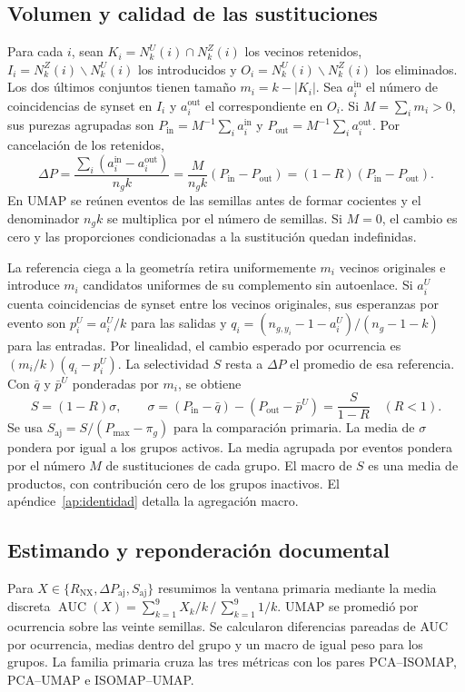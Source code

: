 \subsection{Volumen y calidad de las sustituciones}\label{sec:descomposicion}
Para cada $i$, sean $K_i=N^U_k(i)\cap N^Z_k(i)$ los vecinos retenidos, $I_i=N^Z_k(i)\mathbin{\backslash} N^U_k(i)$ los introducidos y $O_i=N^U_k(i)\mathbin{\backslash} N^Z_k(i)$ los eliminados. Los dos últimos conjuntos tienen tamaño $m_i=k-|K_i|$. Sea $a_i^{\mathrm{in}}$ el número de coincidencias de synset en $I_i$ y $a_i^{\mathrm{out}}$ el correspondiente en $O_i$. Si $M=\sum_i m_i>0$, sus purezas agrupadas son $P_{\mathrm{in}}=M^{-1}\sum_i a_i^{\mathrm{in}}$ y $P_{\mathrm{out}}=M^{-1}\sum_i a_i^{\mathrm{out}}$. Por cancelación de los retenidos,
\begin{equation}\label{eq:delta}
 \Delta P=\frac{\sum_i(a_i^{\mathrm{in}}-a_i^{\mathrm{out}})}{n_g k}
 =\frac{M}{n_g k}(P_{\mathrm{in}}-P_{\mathrm{out}})
 =(1-R)(P_{\mathrm{in}}-P_{\mathrm{out}}).
\end{equation}
En UMAP se reúnen eventos de las semillas antes de formar cocientes y el denominador $n_g k$ se multiplica por el número de semillas. Si $M=0$, el cambio es cero y las proporciones condicionadas a la sustitución quedan indefinidas.

La referencia ciega a la geometría retira uniformemente $m_i$ vecinos originales e introduce $m_i$ candidatos uniformes de su complemento sin autoenlace. Si $a_i^U$ cuenta coincidencias de synset entre los vecinos originales, sus esperanzas por evento son $p_i^U=a_i^U/k$ para las salidas y $q_i=(n_{g,y_i}-1-a_i^U)/(n_g-1-k)$ para las entradas. Por linealidad, el cambio esperado por ocurrencia es $(m_i/k)(q_i-p_i^U)$. La selectividad $S$ resta a $\Delta P$ el promedio de esa referencia. Con $\bar q$ y $\bar p^U$ ponderadas por $m_i$, se obtiene
\begin{equation}\label{eq:select}
 S=(1-R)\sigma,\qquad
 \sigma=(P_{\mathrm{in}}-\bar q)-(P_{\mathrm{out}}-\bar p^U)
       =\frac{S}{1-R}\quad (R<1).
\end{equation}
Se usa $S_{\mathrm{aj}}=S/(P_{\max}-\pi_g)$ para la comparación primaria. La media de $\sigma$ pondera por igual a los grupos activos. La media agrupada por eventos pondera por el número $M$ de sustituciones de cada grupo. El macro de $S$ es una media de productos, con contribución cero de los grupos inactivos. El apéndice~\ref{ap:identidad} detalla la agregación macro.

\subsection{Estimando y reponderación documental}\label{sec:infer}
Para $X\in\{R_{\mathrm{NX}},\Delta P_{\mathrm{aj}},S_{\mathrm{aj}}\}$ resumimos la ventana primaria mediante la media discreta $\operatorname{AUC}(X)=\sum_{k=1}^9 X_k/k\,/\,\sum_{k=1}^9 1/k$. UMAP se promedió por ocurrencia sobre las veinte semillas. Se calcularon diferencias pareadas de AUC por ocurrencia, medias dentro del grupo y un macro de igual peso para los  grupos. La familia primaria cruza las tres métricas con los pares PCA--ISOMAP, PCA--UMAP e ISOMAP--UMAP.


